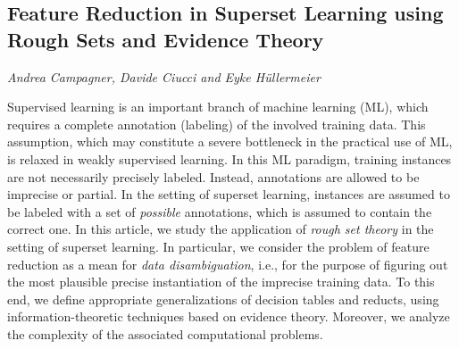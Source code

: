 \documentclass[../booklet.tex]{subfiles}
\begin{document}
\subsection[Feature Reduction in Superset Learning using Rough Sets and Evidence Theory. {\it Andrea Campagner, Davide Ciucci and Eyke Hüllermeier}]{Feature Reduction in Superset Learning using Rough Sets and Evidence Theory}
  

\begin{center}
  {\it Andrea Campagner, Davide Ciucci and Eyke Hüllermeier}
\end{center}

\vskip 0.8cm


Supervised learning is an important branch of machine learning (ML), which requires a complete annotation (labeling) of the involved training data. This assumption, which may constitute a severe bottleneck in the practical use of ML, is relaxed in weakly supervised learning. In this ML paradigm, training instances are not necessarily precisely labeled. Instead, annotations are allowed to be imprecise or partial. In the setting of superset learning,  instances are assumed to be labeled with a set of \emph{possible} annotations, which is assumed to contain the correct one.
In this article, we study the application of \emph{rough set theory} in the setting of superset learning. In particular, we consider the problem of feature reduction as a mean for \emph{data disambiguation}, i.e., for the purpose of figuring out the most plausible precise instantiation of the imprecise training data.
 To this end, we define appropriate generalizations of decision tables and reducts, using information-theoretic techniques based on evidence theory. Moreover, we analyze the complexity of the associated computational problems.
\end{document}

